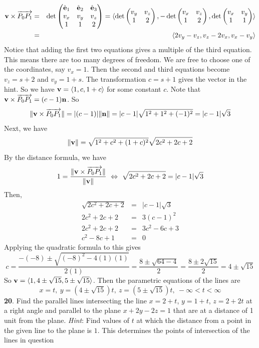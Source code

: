 \documentclass[12pt]{amsbook}
\newcommand{\la}{\langle}
\newcommand{\ra}{\rangle}
\begin{document}
\begin{eqnarray*}
{\bf v}\times\overrightarrow{P_0P_1}&=&\det
\begin{pmatrix}
\hat{\bf e}_1 & \hat{\bf e}_2 & \hat{\bf e}_3\cr v_x&v_y&v_z\cr 1&1&2 \end{pmatrix}=\la \det\begin{pmatrix}v_y&v_z\cr 1&2  \end{pmatrix}, -\det\begin{pmatrix}v_x&v_z\cr 1&2  \end{pmatrix}, \det\begin{pmatrix}v_x&v_y\cr 1&1 \end{pmatrix} \ra \\
&=& \la 2v_y-v_z,v_z-2v_x,v_x-v_y \ra
\end{eqnarray*}
Notice that adding the first two equations gives a multiple of the third equation. This means there are too many degrees of freedom. We are free to choose one of the coordinates, say $v_x=1$. Then the second and third equations become $v_z=s+2$ and $v_y=1+s$. The transformation $c=s+1$ gives the vector in the hint. So we have ${\bf v}=\la 1,c,1+c\ra$ for some constant $c$. Note that ${\bf v}\times\overrightarrow{P_0P_1}=(c-1){\bf n}$. So 
$$\|{\bf v}\times\overrightarrow{P_0P_1}\|=|(c-1)|\|{\bf n}\|=|c-1|\sqrt{1^2+1^2+(-1)^2}=|c-1|\sqrt{3}$$
Next, we have
$$\|{\bf v}\|=\sqrt{1^2+c^2+(1+c)^2}\sqrt{2c^2+2c+2}$$
By the distance formula, we have
$$1=\frac{\|{\bf v}\times\overrightarrow{P_0P_1}\|}{\|{\bf v}\|} \ \Leftrightarrow \ \sqrt{2c^2+2c+2}=|c-1|\sqrt{3}$$
Then,
\begin{eqnarray*}
\sqrt{2c^2+2c+2}&=&|c-1|\sqrt{3} \\
2c^2+2c+2&=&3(c-1)^2 \\
2c^2+2c+2&=&3c^2-6c+3 \\
c^2-8c+1&=&0
\end{eqnarray*}
Applying the quadratic formula to this gives
$$c=\frac{-(-8)\pm \sqrt{(-8)^2-4(1)(1)}}{2(1)}=\frac{8 \pm \sqrt{64-4}}{2}=\frac{8\pm 2\sqrt{15}}{2}=4\pm \sqrt{15}$$
So ${\bf v}=\la 1, 4\pm \sqrt{15}, 5\pm \sqrt{15}\ra$. Then the parametric equations of the lines are
$$x=t, \ y=(4\pm \sqrt{15})t, \ z=(5\pm \sqrt{15})t, \ -\infty<t<\infty$$
{\small\bf 20}. Find the parallel lines 
intersecting
the line $x=2+t$, $y=1+t$, $z=2+2t$ at a right angle and
parallel to the plane $x+2y-2z=1$ that are at a distance of 1 unit
from the plane. {\it Hint}: Find values of $t$ at which the 
distance from a point in the given line to the plane is $1$.
This determines the points of intersection of the lines in question
\end{document}

